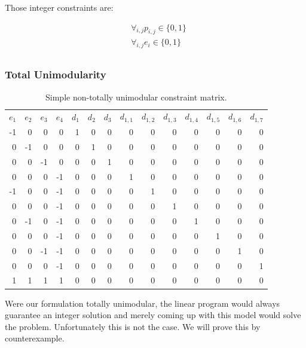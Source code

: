 Those integer constraints are:

\begin{eqnarray*}
  &\forall_{i,j} p_{i,j} \in \{0,1\} \\
  &\forall_{i,j} e_i  \in \{0,1\} \\
\end{eqnarray*}

\subsubsection{Total Unimodularity}

\begin{table}[tbh]
\centering
\begin{tabular}{rrrr|rrrrrrrrrr}
$e_1$ & $e_2$ & $e_3$ & $e_4$ & $d_1$ & $d_2$ & $d_3$& $d_{1,1}$ & $d_{1,2}$ & $d_{1,3}$ & $d_{1,4}$ & $d_{1,5}$ & $d_{1,6}$ & $d_{1,7}$  \\
-1 &  0 &  0 &  0 & 1 & 0 & 0 & 0 & 0 & 0 & 0 & 0 & 0 & 0\\
 0 & -1 &  0 &  0 & 0 & 1 & 0 & 0 & 0 & 0 & 0 & 0 & 0 & 0\\
 0 &  0 & -1 &  0 & 0 & 0 & 1 & 0 & 0 & 0 & 0 & 0 & 0 & 0\\
 0 &  0 &  0 & -1 & 0 & 0 & 0 & 1 & 0 & 0 & 0 & 0 & 0 & 0\\
\cellcolor{gray}-1 &  \cellcolor{gray}0 &  \cellcolor{gray}0 & \cellcolor{gray}-1 & 0 & 0 & 0 & 0 & 1 & 0 & 0 & 0 & 0 & 0\\
 0 &  0 &  0 & -1 & 0 & 0 & 0 & 0 & 0 & 1 & 0 & 0 & 0 & 0\\
 \cellcolor{gray}0 & \cellcolor{gray}-1 &  \cellcolor{gray}0 & \cellcolor{gray}-1 & 0 & 0 & 0 & 0 & 0 & 0 & 1 & 0 & 0 & 0\\
 0 &  0 &  0 & -1 & 0 & 0 & 0 & 0 & 0 & 0 & 0 & 1 & 0 & 0\\
 \cellcolor{gray}0 &  \cellcolor{gray}0 & \cellcolor{gray}-1 & \cellcolor{gray}-1 & 0 & 0 & 0 & 0 & 0 & 0 & 0 & 0 & 1 & 0\\
 0 &  0 &  0 & -1 & 0 & 0 & 0 & 0 & 0 & 0 & 0 & 0 & 0 & 1\\
\cellcolor{gray} 1 & \cellcolor{gray} 1 & \cellcolor{gray} 1 & \cellcolor{gray} 1 & 0 & 0 & 0 & 0 & 0 & 0 & 0 & 0 & 0 & 0\\
\end{tabular}
\caption{Simple non-totally unimodular constraint matrix.}
\label{table:notUni}
\end{table}

Were our formulation totally unimodular, the linear program would always guarantee an integer solution and merely coming up with this model would solve the problem.  Unfortunately this is not the case.  We will prove this by counterexample.

